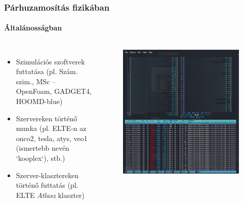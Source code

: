 \begin{frame}
\frametitle{Párhuzamosítás fizikában}
\framesubtitle{Általánosságban}

\begin{columns}
	{\small
	\begin{itemize}
		\item Szimulációs szoftverek futtatása (pl. Szám. szim., MSc -- OpenFoam, GADGET4, HOOMD-blue)
		\item Szervereken történő munka (pl. ELTE-n az onco2, tesla, atys, veo1 (ismertebb nevén `kooplex`), stb.)
		\item Szerver-klasztereken történő futtatás (pl. ELTE \textit{Atlasz} klaszter)
	\end{itemize}}
	
	\begin{figure}
		\includegraphics[width=\textwidth]{img/onco2.png}
	\end{figure}

\end{columns}

\end{frame}